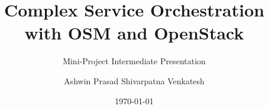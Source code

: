 \title{Complex Service Orchestration with OSM and OpenStack} 

\subtitle{Mini-Project Intermediate Presentation}

\author{Ashwin Prasad Shivarpatna Venkatesh}


\date{\today} 

\newcommand{\upbcolor}{uni-blue} 

